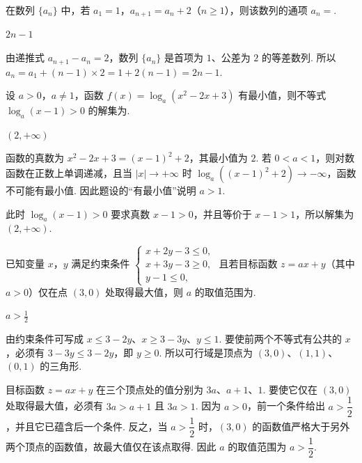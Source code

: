 \begin{problem}
在数列 \( \{a_{n}\} \) 中，若 \(a_{1}=1\)，\(a_{n+1}=a_{n}+2\)（\(n\geqslant1\)），则该数列的通项 \( a_{n}= \)\fillinblank{}.
\end{problem}

\begin{answer}
\(2n-1\)
\end{answer}

\begin{solution}
由递推式 \(a_{n+1}-a_n=2\)，数列 \(\{a_n\}\) 是首项为 \(1\)、公差为 \(2\) 的等差数列. 所以
\(a_n=a_1+(n-1)\times2=1+2(n-1)=2n-1\).
\end{solution}

\begin{problem}
设 \(a > 0\)，\(a \neq 1\)，函数 \(f(x) = \log_a(x^2 - 2x + 3)\) 有最小值，则不等式 \(\log_a(x - 1) > 0\) 的解集为\fillinblank{}.
\end{problem}

\begin{answer}
\((2,+\infty)\)
\end{answer}

\begin{solution}
函数的真数为 \(x^2-2x+3=(x-1)^2+2\)，其最小值为 \(2\). 若 \(0<a<1\)，则对数函数在正数上单调递减，且当 \(|x|\to+\infty\) 时 \(\log_a((x-1)^2+2)\to-\infty\)，函数不可能有最小值. 因此题设的“有最小值”说明 \(a>1\).

此时 \(\log_a(x-1)>0\) 要求真数 \(x-1>0\)，并且等价于 \(x-1>1\)，所以解集为 \((2,+\infty)\).
\end{solution}

\begin{problem}
已知变量 \(x\)，\(y\) 满足约束条件 \(\begin{cases}
x + 2y - 3 \leqslant 0,\\
x + 3y - 3 \geqslant 0,\\
y - 1 \leqslant 0,
\end{cases}\) 且若目标函数 \(z = ax + y\)（其中 \(a > 0\)）仅在点 \((3,0)\) 处取得最大值，则 \(a\) 的取值范围为\fillinblank{}.
\end{problem}

\begin{answer}
\(a>\frac{1}{2}\)
\end{answer}

\begin{solution}
由约束条件可写成 \(x\leqslant3-2y\)、\(x\geqslant3-3y\)、\(y\leqslant1\). 要使前两个不等式有公共的 \(x\)，必须有 \(3-3y\leqslant3-2y\)，即 \(y\geqslant0\). 所以可行域是顶点为 \((3,0)\)、\((1,1)\)、\((0,1)\) 的三角形.

目标函数 \(z=ax+y\) 在三个顶点处的值分别为 \(3a\)、\(a+1\)、\(1\). 要使它仅在 \((3,0)\) 处取得最大值，必须有 \(3a>a+1\) 且 \(3a>1\). 因为 \(a>0\)，前一个条件给出 \(a>\dfrac12\)，并且它已蕴含后一个条件. 反之，当 \(a>\dfrac12\) 时，\((3,0)\) 的函数值严格大于另外两个顶点的函数值，故最大值仅在该点取得. 因此 \(a\) 的取值范围为 \(a>\dfrac12\).
\end{solution}

